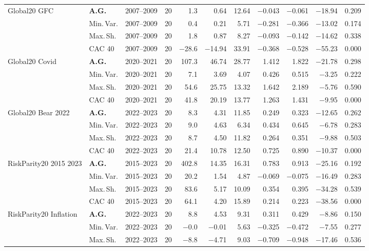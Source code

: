 \begin{longtable}{p{2.6cm} l c c r r r r r r r}
Global20 GFC & \textbf{A.G.} & 2007--2009 & 20 & 1.3 & 0.64 & 12.64 & $-$0.043 & $-$0.061 & $-$18.94 & 0.209 \\
 & Min.\,Var. & 2007--2009 & 20 & 0.4 & 0.21 & 5.71 & $-$0.281 & $-$0.366 & $-$13.02 & 0.174 \\
 & Max.\,Sh. & 2007--2009 & 20 & 1.8 & 0.87 & 8.27 & $-$0.093 & $-$0.142 & $-$14.62 & 0.338 \\
 & CAC 40 & 2007--2009 & 20 & $-$28.6 & $-$14.94 & 33.91 & $-$0.368 & $-$0.528 & $-$55.23 & 0.000 \\
\midrule
Global20 Covid & \textbf{A.G.} & 2020--2021 & 20 & 107.3 & 46.74 & 28.77 & 1.412 & 1.822 & $-$21.78 & 0.298 \\
 & Min.\,Var. & 2020--2021 & 20 & 7.1 & 3.69 & 4.07 & 0.426 & 0.515 & $-$3.25 & 0.222 \\
 & Max.\,Sh. & 2020--2021 & 20 & 54.6 & 25.75 & 13.32 & 1.642 & 2.189 & $-$5.76 & 0.590 \\
 & CAC 40 & 2020--2021 & 20 & 41.8 & 20.19 & 13.77 & 1.263 & 1.431 & $-$9.95 & 0.000 \\
\midrule
Global20 Bear 2022 & \textbf{A.G.} & 2022--2023 & 20 & 8.3 & 4.31 & 11.85 & 0.249 & 0.323 & $-$12.65 & 0.262 \\
 & Min.\,Var. & 2022--2023 & 20 & 9.0 & 4.63 & 6.34 & 0.434 & 0.645 & $-$6.78 & 0.283 \\
 & Max.\,Sh. & 2022--2023 & 20 & 8.7 & 4.50 & 11.82 & 0.264 & 0.351 & $-$9.88 & 0.503 \\
 & CAC 40 & 2022--2023 & 20 & 21.4 & 10.78 & 12.50 & 0.725 & 0.890 & $-$10.37 & 0.000 \\
\midrule
RiskParity20 2015 2023 & \textbf{A.G.} & 2015--2023 & 20 & 402.8 & 14.35 & 16.31 & 0.783 & 0.913 & $-$25.16 & 0.192 \\
 & Min.\,Var. & 2015--2023 & 20 & 20.2 & 1.54 & 4.87 & $-$0.069 & $-$0.075 & $-$16.49 & 0.283 \\
 & Max.\,Sh. & 2015--2023 & 20 & 83.6 & 5.17 & 10.09 & 0.354 & 0.395 & $-$34.28 & 0.539 \\
 & CAC 40 & 2015--2023 & 20 & 64.1 & 4.20 & 15.89 & 0.214 & 0.223 & $-$38.56 & 0.000 \\
\midrule
RiskParity20 Inflation & \textbf{A.G.} & 2022--2023 & 20 & 8.8 & 4.53 & 9.31 & 0.311 & 0.429 & $-$8.86 & 0.150 \\
 & Min.\,Var. & 2022--2023 & 20 & $-$0.0 & $-$0.01 & 5.63 & $-$0.325 & $-$0.472 & $-$7.55 & 0.277 \\
 & Max.\,Sh. & 2022--2023 & 20 & $-$8.8 & $-$4.71 & 9.03 & $-$0.709 & $-$0.948 & $-$17.46 & 0.536 \\

\end{longtable}
